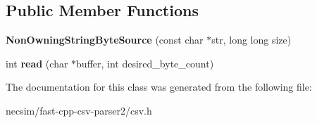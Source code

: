 \subsection*{Public Member Functions}
\begin{DoxyCompactItemize}
\item 
{\bfseries Non\+Owning\+String\+Byte\+Source} (const char $\ast$str, long long size)\hypertarget{classio_1_1detail_1_1_non_owning_string_byte_source_a8fd604017b38e20f90386b6e10bd95a3}{}\label{classio_1_1detail_1_1_non_owning_string_byte_source_a8fd604017b38e20f90386b6e10bd95a3}

\item 
int {\bfseries read} (char $\ast$buffer, int desired\+\_\+byte\+\_\+count)\hypertarget{classio_1_1detail_1_1_non_owning_string_byte_source_aba194be7e3a141f40d683db483a620bb}{}\label{classio_1_1detail_1_1_non_owning_string_byte_source_aba194be7e3a141f40d683db483a620bb}

\end{DoxyCompactItemize}


The documentation for this class was generated from the following file\+:\begin{DoxyCompactItemize}
\item 
necsim/fast-\/cpp-\/csv-\/parser2/csv.\+h\end{DoxyCompactItemize}
